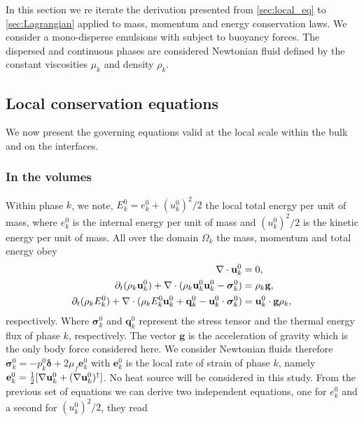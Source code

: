 In this section we re iterate the derivation presented from \ref{sec:local_eq} to \ref{sec:Lagrangian} applied to mass, momentum and energy conservation laws. 
We consider a mono-disperse emulsions with subject to buoyancy forces. 
The dispersed and continuous phases are considered Newtonian fluid defined by the constant viscosities $\mu_k$ and density $\rho_k$.


\subsection{Local conservation equations}

We now present the governing equations valid at the local scale within the bulk and on the interfaces. 

\subsubsection{In the volumes}
Within phase $k$, we note, $E_k^0 = e_k^0 + (u_k^0)^2/2$ the local total energy per unit of mass, where $e_k^0$ is the internal energy per unit of mass and $(u_k^0)^2/2$ is the kinetic energy per unit of mass.
All over the domain $\Omega_k$ the mass, momentum and total energy obey 
\begin{align}
    \label{eq:dt_rho}
    \mathbf{\nabla}\cdot \textbf{u}_k^0
    &= 
    0,\\
    \label{eq:dt_rhou_k}
    \partial_t (\rho_k\textbf{u}_k^0)  
    + \mathbf{\nabla}\cdot (
        \rho_k\textbf{u}_k^0\textbf{u}_k^0
        - \bm{\sigma}_k^0 
    )
    &= 
    \rho_k \textbf{g},\\
    \label{eq:dt_rhoE_k}
    \partial_t (\rho_kE_k^0)  
    + \mathbf{\nabla}\cdot (
        \rho_kE_k^0\textbf{u}_k^0
        + \textbf{q}_k^0
        - \textbf{u}_k^0 \cdot \bm{\sigma}_k^0 
        )
    &= 
    \textbf{u}_k^0 \cdot \textbf{g}  \rho_k, 
\end{align} 
respectively. 
Where $\bm\sigma_k^0$ and $\textbf{q}_k^0$ represent the stress tensor and the thermal energy flux of phase $k$, respectively. 
The vector $\textbf{g}$ is the acceleration of gravity which is the only body force considered here.
We consider Newtonian fluids therefore $\bm\sigma_k^0 = -p_k^0\bm\delta + 2\mu_f \textbf{e}_k^0$ with $\textbf{e}_k^0$ is the local rate of strain of phase $k$, namely $\textbf{e}_k^0 = \frac{1}{2}[\mathbf{\nabla} \textbf{u}_k^0 + (\mathbf{\nabla} \textbf{u}_k^0)^\dagger]$. 
No heat source will be considered in this study. 
From the previous set of equations we can derive two independent equations, one for $e_k^0$ and a second for $(u_k^0)^2/2$, they read
